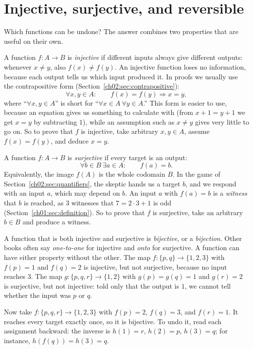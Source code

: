 \section{Injective, surjective, and reversible}\label{ch03:sec:injsurj}
Which functions can be undone? The answer combines two properties that are useful on their own.

A function $f:A\to B$ is \emph{injective} if different inputs always give different outputs: whenever $x\ne y$, also $f(x)\ne f(y)$. An injective function loses no information, because each output tells us which input produced it. In proofs we usually use the contrapositive form (Section~\ref{ch02:sec:contrapositive}):
\[
\forall x,y\in A:\qquad f(x)=f(y)\Rightarrow x=y,
\]
where ``$\forall x,y\in A$'' is short for ``$\forall x\in A\ \forall y\in A$.'' This form is easier to use, because an equation gives us something to calculate with (from $x+1=y+1$ we get $x=y$ by subtracting $1$), while an assumption such as $x\ne y$ gives very little to go on. So to prove that $f$ is injective, take arbitrary $x,y\in A$, assume $f(x)=f(y)$, and deduce $x=y$.

A function $f:A\to B$ is \emph{surjective} if every target is an output:
\[
\forall b\in B\ \exists a\in A:\qquad f(a)=b.
\]
Equivalently, the image $f(A)$ is the whole codomain $B$. In the game of Section~\ref{ch02:sec:quantifiers}, the skeptic hands us a target $b$, and we respond with an input $a$, which may depend on $b$. An input $a$ with $f(a)=b$ is a \emph{witness} that $b$ is reached, as $3$ witnesses that $7=2\cdot3+1$ is odd (Section~\ref{ch01:sec:definition}). So to prove that $f$ is surjective, take an arbitrary $b\in B$ and produce a witness.

A function that is both injective and surjective is \emph{bijective}, or a \emph{bijection}. Other books often say \emph{one-to-one} for injective and \emph{onto} for surjective. A function can have either property without the other. The map $f:\{p,q\}\to\{1,2,3\}$ with $f(p)=1$ and $f(q)=2$ is injective, but not surjective, because no input reaches $3$. The map $g:\{p,q,r\}\to\{1,2\}$ with $g(p)=g(q)=1$ and $g(r)=2$ is surjective, but not injective: told only that the output is $1$, we cannot tell whether the input was $p$ or $q$.

Now take $f:\{p,q,r\}\to\{1,2,3\}$ with $f(p)=2$, $f(q)=3$, and $f(r)=1$. It reaches every target exactly once, so it is bijective. To undo it, read each assignment backward: the inverse is $h(1)=r$, $h(2)=p$, $h(3)=q$; for instance, $h(f(q))=h(3)=q$.

